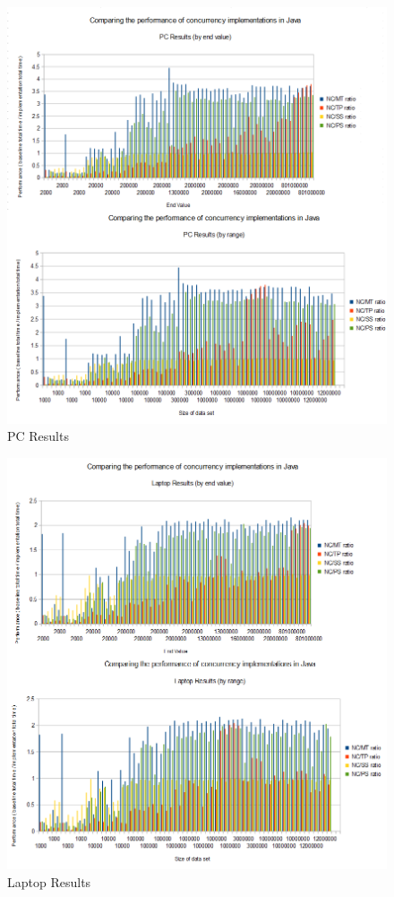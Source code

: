 \documentclass[]{report}
\begin{document}
\chapter{}
\begin{figure}[h!]
	\caption{PC Results}
	\includegraphics[scale=0.75]{PC_GRAPHS.png}
\end{figure}

\begin{figure}[h!]
	\caption{Laptop Results}
	\includegraphics[scale=0.75]{LAPTOP_GRAPHS.png}
\end{figure}
\end{document}
